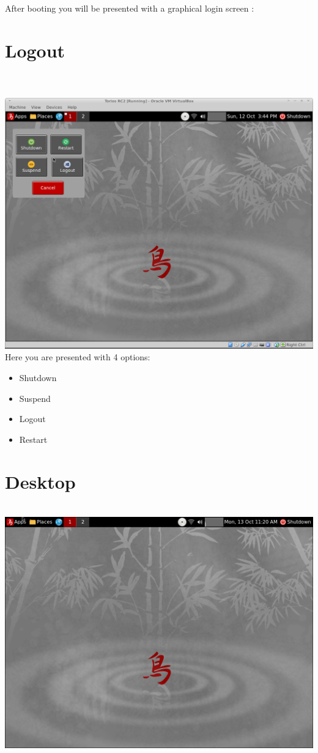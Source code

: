 \documentclass[12pt,a4paper]{book}
\begin{document}
After booting you will be presented with a graphical login screen :

\chapter{Logout}

\\
\\
\includegraphics[width=0.8\linewidth]{screen-shots/torios-rc2-shutdown-menu} 
Here you are presented with 4 options:\\
\begin{itemize}
\item{Shutdown}
\item{Suspend}
\item{Logout}
\item{Restart}

\end{itemize}

\newpage 

 
\chapter{Desktop}

\\


\includegraphics[width=0.8\linewidth]{screen-shots/Torios_Alpha2-desktop}
\end{document}
